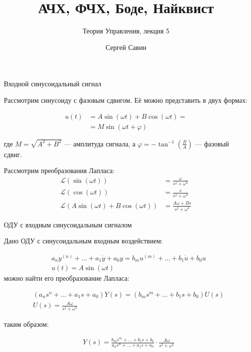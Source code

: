 \documentclass{beamer}
\title{АЧХ, ФЧХ, Боде, Найквист}
\subtitle{Теория Управления, лекция 5}
\author{Сергей Савин}
\date{\mydate}
\begin{document}
\maketitle



\begin{frame}{Входной синусоидальный сигнал}
	\begin{flushleft}
		
		Рассмотрим синусоиду с фазовым сдвигом. Её можно представить в двух формах:
		
		\begin{align}
			u(t) &= A \sin (\omega t) + B \cos (\omega t) = \\
			&= M \sin  (\omega t + \varphi)
		\end{align}
		
		где $M = \sqrt{A^2 + B^2}$ — амплитуда сигнала, а $ \varphi = - \tan^{-1} \left( \frac{B}{A} \right)$ — фазовый сдвиг.
		
		\bigskip
		
		Рассмотрим преобразования Лапласа:
		\begin{align}
			\mathcal{L} (\sin (\omega t)) &= \frac{\omega}{s^2 + \omega^2}
			\\
			\mathcal{L} (\cos (\omega t)) &= \frac{s}{s^2 + \omega^2}
			\\
			\mathcal{L} (A \sin (\omega t) + B \cos (\omega t) ) &= \frac{A \omega + B s}{s^2 + \omega^2}
		\end{align}		
		
	\end{flushleft}
\end{frame}

\begin{frame}{ОДУ с входным синусоидальным сигналом}
	\begin{flushleft}
		
		Дано ОДУ с синусоидальным входным воздействием:
		
		\begin{align}
			&a_n y^{(n)} + ... + a_1 \dot y  + a_0 y = b_m u^{(m )}+ ... + b_1 \dot u + b_0 u
			\\
			&u(t) = A \sin (\omega t) 
		\end{align}
		можно найти его преобразование Лапласа:
		
		\begin{align}
			&(a_n s^n + ... + a_1 s  + a_0) Y(s) = (b_m s^m + ... + b_1 s  + b_0) U(s)
			\\
			&U(s) = \frac{A \omega }{s^2 + \omega^2} 
		\end{align}
		
		таким образом:
		
		\begin{align}
			&Y(s) = \frac{b_m s^m + ... + b_1 s  + b_0}{a_n s^n + ... + a_1 s  + a_0} \cdot \frac{A \omega}{s^2 + \omega^2} 
		\end{align}
		
	\end{flushleft}
\end{frame}
\end{document}
